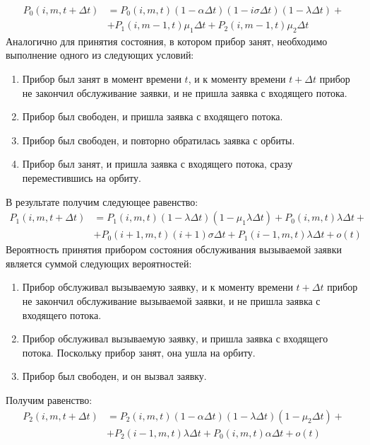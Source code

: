 \begin{equation*}
	\begin{split}
	P_{0}(i,m,t+\Delta t) &=P_{0}(i,m,t)(1-\alpha\Delta t)(1 - i\sigma\Delta t)(1-\lambda\Delta t)+ \\ &+ P_{1}(i,m-1,t)\mu_{1}\Delta t + P_{2}(i,m-1,t)\mu_{2}\Delta t
	\end{split}
\end{equation*}
Аналогично для принятия состояния, в котором прибор занят, необходимо выполнение одного из следующих условий:
\begin{enumerate}
	\item Прибор был занят в момент времени $t$,  и к моменту времени $t+\Delta t$ прибор не закончил обслуживание заявки, и не пришла заявка с входящего потока.
	\item Прибор был свободен, и пришла заявка с входящего потока.
	\item Прибор был свободен, и повторно обратилась заявка с орбиты.
	\item Прибор был занят, и пришла заявка с входящего потока, сразу переместившись на орбиту.
\end{enumerate}
В результате получим следующее равенство:
\begin{equation*}
	\begin{split}
			P_{1}(i,m,t+\Delta t)&=P_{1}(i,m,t)(1-\lambda\Delta t)(1-\mu_{1}\lambda\Delta t)+P_{0}(i,m,t)\lambda\Delta t +\\ &+ P_{0}(i+1,m,t)(i+1)\sigma\Delta t + P_{1}(i-1,m,t)\lambda\Delta t + o(t)
	\end{split}
\end{equation*}
Вероятность принятия прибором состояния обслуживания вызываемой заявки является суммой следующих вероятностей:
\begin{enumerate}
	\item Прибор обслуживал вызываемую заявку, и к моменту времени $t+\Delta t$ прибор не закончил обслуживание вызываемой заявки, и не пришла заявка с входящего потока.
	\item Прибор обслуживал вызываемую заявку, и пришла заявка с входящего потока. Поскольку прибор занят, она ушла на орбиту.
	\item Прибор был свободен, и он вызвал заявку.
\end{enumerate}
Получим равенство:
\begin{equation*}
	\begin{split}
	P_{2}(i,m,t+\Delta t) &=P_{2}(i,m,t)(1-\alpha\Delta t)(1 - \lambda\Delta t)(1 - \mu_{2}\Delta t)+ \\ &+ P_{2}(i-1,m,t)\lambda\Delta t + P_{0}(i,m,t)\alpha\Delta t + o(t)
\end{split}
\end{equation*}
